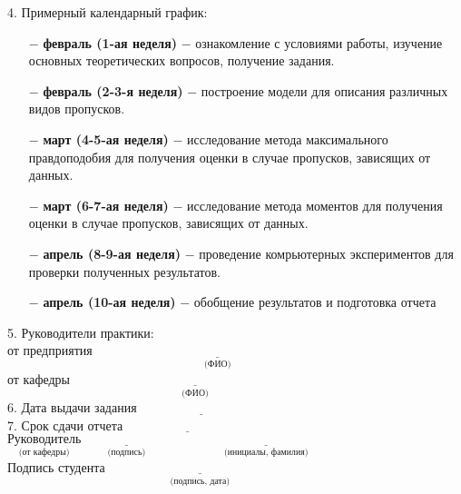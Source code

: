 \begin{flushleft}
{    4. Примерный календарный график:\\[0.2cm]
    \begin{itemize}
        \item[$-$] \textbf{февраль (1-ая неделя)} $-$ ознакомление с условиями работы,
        изучение основных теоретических вопросов, получение задания.
        \item[$-$] \textbf{февраль (2-3-я неделя)} $-$ построение модели для описания различных 
        видов пропусков.
        \item[$-$] \textbf{март (4-5-ая неделя)} $-$ исследование метода максимального правдоподобия для получения оценки
        в случае пропусков, зависящих от данных.
        \item[$-$] \textbf{март (6-7-ая неделя)} $-$ исследование метода моментов для получения оценки
        в случае пропусков, зависящих от данных.
        \item[$-$] \textbf{апрель (8-9-ая неделя)} $-$ проведение комрьютерных экспериментов для
        проверки полученных результатов.
        \item[$-$] \textbf{апрель (10-ая неделя)} $-$ обобщение результатов и подготовка отчета
    \end{itemize}

    \vspace{0.4cm}
    5. Руководители практики:\\[0.2cm]
    \hspace*{0.2cm}от предприятия $\underset{\text{(ФИО)}}{\underline{\hspace{8cm}}}$\\[0.1cm]
    \hspace*{0.2cm}от кафедры $\underset{\text{(ФИО)}}{\underline{\hspace{8cm}}}$\\[0.3cm]

    \vspace{0.6cm}
    6. Дата выдачи задания \hspace{0.2cm} $\underline{\hspace{4cm}}$\\[0.2cm]

    7. Срок сдачи отчета \hspace{0.88cm} $\underline{\hspace{4cm}}$\\[0.6cm]
    
    {\small $\underset{\text{(от кафедры)}}{\text{Руководитель}} \underset{\text{(подпись)}}{\underline{\hspace{3cm}}}\;\underset{\text{(инициалы, фамилия)}}{\underline{\hspace{6cm}}}$\\[0.6cm]
    Подпись студента $\underset{\text{(подпись, дата)}}{\underline{\hspace{6cm}}}$}
    
    }
\end{flushleft}